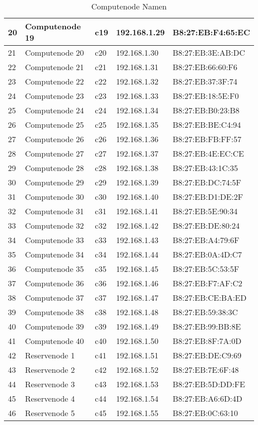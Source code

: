\begin{table}[H]
\begin{tabular}{p{1cm}p{3cm}p{3cm}p{4cm}p{4cm}}
20 & Computenode 19 & c19 & 192.168.1.29 & B8:27:EB:F4:65:EC\\\hline
21 & Computenode 20 & c20 & 192.168.1.30 & B8:27:EB:3E:AB:DC\\\hline
22 & Computenode 21 & c21 & 192.168.1.31 & B8:27:EB:66:60:F6\\\hline
23 & Computenode 22 & c22 & 192.168.1.32 & B8:27:EB:37:3F:74\\\hline
24 & Computenode 23 & c23 & 192.168.1.33 & B8:27:EB:18:5E:F0\\\hline
25 & Computenode 24 & c24 & 192.168.1.34 & B8:27:EB:B0:23:B8\\\hline
26 & Computenode 25 & c25 & 192.168.1.35 & B8:27:EB:BE:C4:94\\\hline
27 & Computenode 26 & c26 & 192.168.1.36 & B8:27:EB:FB:FF:57\\\hline
28 & Computenode 27 & c27 & 192.168.1.37 & B8:27:EB:4E:EC:CE\\\hline
29 & Computenode 28 & c28 & 192.168.1.38 & B8:27:EB:43:1C:35\\\hline
30 & Computenode 29 & c29 & 192.168.1.39 & B8:27:EB:DC:74:5F\\\hline
31 & Computenode 30 & c30 & 192.168.1.40 & B8:27:EB:D1:DE:2F\\\hline
32 & Computenode 31 & c31 & 192.168.1.41 & B8:27:EB:5E:90:34\\\hline
33 & Computenode 32 & c32 & 192.168.1.42 & B8:27:EB:DE:80:24\\\hline
34 & Computenode 33 & c33 & 192.168.1.43 & B8:27:EB:A4:79:6F\\\hline
35 & Computenode 34 & c34 & 192.168.1.44 & B8:27:EB:0A:4D:C7\\\hline
36 & Computenode 35 & c35 & 192.168.1.45 & B8:27:EB:5C:53:5F\\\hline
37 & Computenode 36 & c36 & 192.168.1.46 & B8:27:EB:F7:AF:C2\\\hline
38 & Computenode 37 & c37 & 192.168.1.47 & B8:27:EB:CE:BA:ED\\\hline
39 & Computenode 38 & c38 & 192.168.1.48 & B8:27:EB:59:38:3C\\\hline
40 & Computenode 39 & c39 & 192.168.1.49 & B8:27:EB:99:BB:8E\\\hline
41 & Computenode 40 & c40 & 192.168.1.50 & B8:27:EB:8F:7A:0D\\\hline
42 & Reservenode 1 & c41 & 192.168.1.51 & B8:27:EB:DE:C9:69\\\hline
43 & Reservenode 2 & c42 & 192.168.1.52 & B8:27:EB:7E:6F:48\\\hline
44 & Reservenode 3 & c43 & 192.168.1.53 & B8:27:EB:5D:DD:FE\\\hline
45 & Reservenode 4 & c44 & 192.168.1.54 & B8:27:EB:A6:6D:4D\\\hline
46 & Reservenode 5 & c45 & 192.168.1.55 & B8:27:EB:0C:63:10\\\hline
\end{tabular}
\caption{Computenode Namen}
\end{table}